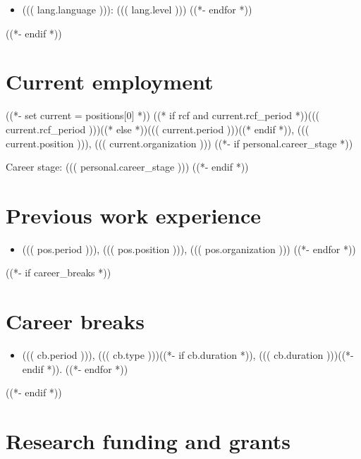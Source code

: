 \documentclass[a4paper,12pt]{article}
\begin{document}
\begin{itemize}
((*- for lang in languages *))
\item ((( lang.language ))): ((( lang.level )))
((*- endfor *))
\end{itemize}
((*- endif *))

\section*{Current employment}

((*- set current = positions[0] *))
((* if rcf and current.rcf_period *))((( current.rcf_period )))((* else *))((( current.period )))((* endif *)), ((( current.position ))), ((( current.organization )))
((*- if personal.career_stage *))

Career stage: ((( personal.career_stage )))
((*- endif *))

\section*{Previous work experience}

\begin{itemize}
((*- for pos in positions[1:] *))
\item ((( pos.period ))), ((( pos.position ))), ((( pos.organization )))
((*- endfor *))
\end{itemize}

((*- if career_breaks *))
\section*{Career breaks}

\begin{itemize}
((*- for cb in career_breaks *))
\item ((( cb.period ))), ((( cb.type )))((*- if cb.duration *)), ((( cb.duration )))((*- endif *)).
((*- endfor *))
\end{itemize}
((*- endif *))

\section*{Research funding and grants}
\end{document}
